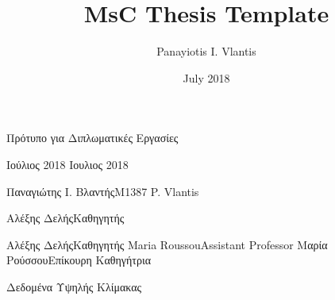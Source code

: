 \documentclass{thesis}
\begin{document}
\title{
  MsC Thesis Template
}{
  Πρότυπο για Διπλωματικές Εργασίες
}


\date {July 2018}
      {Ιούλιος 2018}
      {Ιουλιος 2018} %

\author {Panayiotis I. Vlantis}
        {Παναγιώτης Ι. Βλαντής}{M1387}
        {P. Vlantis}

            {Αλέξης Δελής}{Καθηγητής}

           {Αλέξης Δελής}{Καθηγητής}
           {Maria Roussou}{Assistant Professor}
           {Μαρία Ρούσσου}{Επίκουρη Καθηγήτρια}

\subject {Big Data}{Δεδομένα Υψηλής Κλίμακας}




\maketitle

\begingroup
  \hypersetup{linkcolor=black}
  \tableofcontents
  \thispagestyle{empty}
  \clearpage
  \listoftables
  \thispagestyle{empty}
  \clearpage
  \listoffigures
  \thispagestyle{empty}
  \clearpage
\endgroup



\begin{appendix}
  \appendixstartedtrue
  
\end{appendix}

\hypersetup{linkcolor=black}

{}

\end{document}
